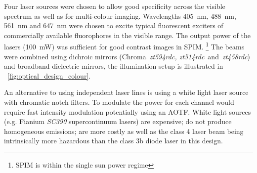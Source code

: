 Four %
laser sources were chosen to allow good specificity across the visible spectrum as well  as for multi-colour imaging.
Wavelengths \textcolor{455nm}{\SI{405}{\nano\meter}},  \textcolor{488nm}{\SI{488}{\nano\meter}},  \textcolor{561nm}{\SI{561}{\nano\meter}} and \textcolor{647nm}{\SI{647}{\nano\meter}} were chosen to excite typical fluorescent exciters of commercially available fluorophores in the visible range.
The output power of the lasers (\SI{100}{\milli\watt}) was sufficient for good contrast images in SPIM.\@
\footnote{SPIM is within the single sun power regime} %
The beams were combined %
using dichroic mirrors %
(Chroma~\emph{zt594rdc, zt514rdc}~and~\emph{zt458rdc}) and broadband dielectric mirrors,
the illumination setup is illustrated in \figurename~\ref{fig:optical_design_colour}.

An alternative to using independent laser lines is using a white light laser source with chromatic notch filters. %
To modulate the power for each channel would require fast intensity modulation potentially using an \gls{AOTF}.
White light sources (e.g. Fianium \emph{SC390} supercontinuum lasers) are expensive; do not produce homogeneous emissions;
are more costly as well as the class 4 laser beam being intrinsically more hazardous than the class 3b diode laser in this design.

